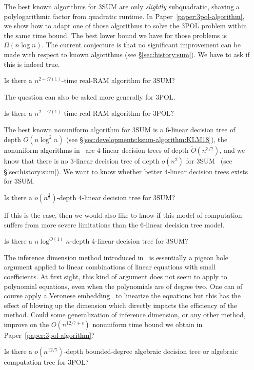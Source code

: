 The best known algorithms for 3SUM are only \emph{slightly} subquadratic,
shaving a polylogarithmic factor from quadratic runtime.
In Paper~\ref{paper:3pol-algorithm}, we show how to adapt one of those
algorithms to solve the 3POL problem within the same time bound.
%
The best lower bound we have for those problems is \(\Omega(n \log n)\). The
current conjecture is that no significant improvement can be made with respect
to known algorithms (see
\S\ref{sec:history:sum}).
%
We have to ask if this is indeed true.
\begin{openquestion}
	Is there a \(n^{2-\Omega(1)}\)-time real-RAM algorithm for 3SUM?
\end{openquestion}

The question can also be asked more generally for 3POL.
\begin{openquestion}
	Is there a \(n^{2-\Omega(1)}\)-time real-RAM algorithm for 3POL?
\end{openquestion}

The best known nonuniform algorithm for 3SUM is a \(6\)-linear decision tree of
depth \(O(n \log^2 n)\) (see \S\ref{sec:developments:ksum-algorithm:KLM18}),
the nonuniform algorithms in~\cite{GP18,Fr15,GS15} are
\(4\)-linear decision trees of depth \( \tilde{O}(n^{3/2}) \), and we know that
there is no \(3\)-linear decision tree of depth \(o(n^2)\) for
3SUM~\cite{Er99a} (see \S\ref{sec:history:sum}).
We want to know whether better \(4\)-linear decision trees exists for 3SUM.
\begin{openquestion}
	Is there a \(o(n^{\frac 32})\)-depth \(4\)-linear decision tree for 3SUM?
\end{openquestion}

If this is the case, then we would also like to know if this model of
computation suffers from more severe limitations than the \(6\)-linear decision tree
model.
\begin{openquestion}
	Is there a \(n \log^{O(1)} n\)-depth \(4\)-linear decision tree for 3SUM?
\end{openquestion}

The inference dimension method introduced in~\cite{KLM18} is essentially a
pigeon hole argument applied to linear combinations of linear equations with small coefficients.
At first sight, this kind of argument does not seem to apply to polynomial
equations, even when the polynomials are of degree two. One can of course apply
a Veronese embedding~\cite{Har77,Har13} to linearize the equations but this has
the effect of blowing up the dimension which directly impacts the efficiency of
the method. Could some generalization of inference dimension, or any other
method,
improve on the \(O(n^{12/7 + \epsilon})\) nonuniform time bound we obtain in
Paper~\ref{paper:3pol-algorithm}?
\begin{openquestion}
	Is there a \(o(n^{12/7})\)-depth bounded-degree algebraic decision tree or
	algebraic computation tree for 3POL?
\end{openquestion}

